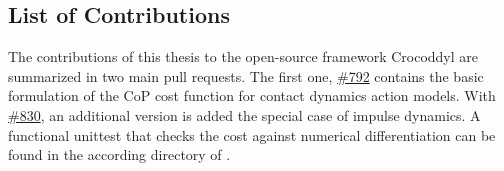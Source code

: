 \subsection{List of Contributions}
The contributions of this thesis to the open-source framework Crocoddyl are summarized in two main pull requests. The first one, \hyperlink{https://github.com/loco-3d/crocoddyl/pull/792}{\#792} contains the basic formulation of the \gls{CoP} cost function for contact dynamics action models. With \hyperlink{https://github.com/loco-3d/crocoddyl/pull/830}{\#830}, an additional version is added the special case of impulse dynamics.
A functional unittest that checks the cost against numerical differentiation can be found in the according directory of \cite{crocoddylweb}.


















